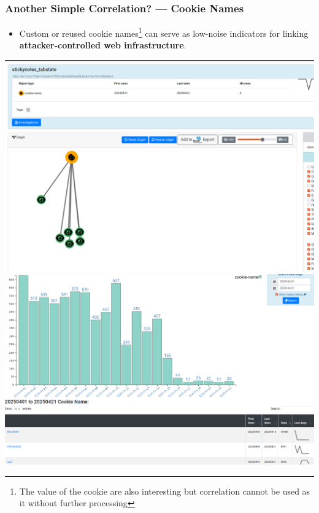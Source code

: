 \documentclass[10pt,aspectratio=169, colorlinks=true, linkcolor=circlBlue]{beamer}
\begin{document}
\begin{frame}
    \frametitle{Another Simple Correlation? — Cookie Names}
    \begin{center}
	\begin{itemize}
		\item Custom or reused cookie names\footnote{The value of the cookie are also interesting but correlation cannot be used as it without further processing} can serve as low-noise indicators for linking {\bf attacker-controlled web infrastructure}.
	\end{itemize}
        \vspace{1em}
        \includegraphics[scale=0.12]{./img/cookies.png}
        \hspace{1em}
        \includegraphics[scale=0.12]{./img/cookies-2.png}
    \end{center}
\end{frame}
\end{document}
